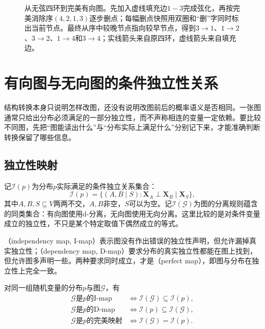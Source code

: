 \begin{figure}[htbp]
  \centering
  
  \caption{从无弦四环到完美有向图。先加入虚线填充边$1-3$完成弦化，再按完美消除序$(4,2,1,3)$逐步删点；每幅删点快照用双圈和“删”字同时标出当前节点。最终从序中较晚节点指向较早节点，得到$3\to1$、$1\to2$、$3\to2$、$1\to4$和$3\to4$；实线箭头来自原四环，虚线箭头来自填充边。}
  \label{fig:pgm-representations-chordal-conversion}
\end{figure}

\section{有向图与无向图的条件独立性关系}
\label{sec:pgm-representations-independence}

结构转换本身只说明怎样改图，还没有说明改图前后的概率语义是否相同。一张图通常只给出分布必须满足的一部分独立性，而不声称相连的变量一定依赖。要比较不同图，先把“图能读出什么”与“分布实际上满足什么”分别记下来，才能准确判断转换保留了哪些信息。

\subsection{独立性映射}
\label{sec:pgm-representations-maps}

记$\mathcal{I}(p)$为分布$p$实际满足的条件独立关系集合：
\begin{equation}
  \mathcal{I}(p)
  =
  \bigl\{(A,B\mid S):
  \bm{X}_A\perp\bm{X}_B\mid\bm{X}_S\bigr\},
  \label{eq:pgm-representations-distribution-independences}
\end{equation}
其中$A,B,S\subseteq V$两两不交，$A,B$非空，$S$可以为空。记$\mathcal{I}(\mathcal{G})$为图的分离规则蕴含的同类集合：有向图使用d-分离，无向图使用无向分离。这里比较的是对条件变量成立的独立性，不只是某个特定取值下偶然成立的等式。

（independency map, I-map）表示图没有作出错误的独立性声明，但允许漏掉真实独立性；（dependency map, D-map）要求分布的真实独立性都能在图上找到，但允许图多声明一些。两种要求同时成立，才是（perfect map），即图与分布在独立性上完全一致。

\begin{definition}[三类独立性映射]
  \label{def:pgm-representations-maps}
  对同一组随机变量的分布$p$与图$\mathcal{G}$，有
  \begin{equation}
    \begin{aligned}
      \mathcal{G}\text{是}p\text{的I-map}
      &\iff \mathcal{I}(\mathcal{G})\subseteq\mathcal{I}(p),\\
      \mathcal{G}\text{是}p\text{的D-map}
      &\iff \mathcal{I}(p)\subseteq\mathcal{I}(\mathcal{G}),\\
      \mathcal{G}\text{是}p\text{的完美映射}
      &\iff \mathcal{I}(\mathcal{G})=\mathcal{I}(p).
    \end{aligned}
    \label{eq:pgm-representations-map-inclusions}
  \end{equation}
\end{definition}

